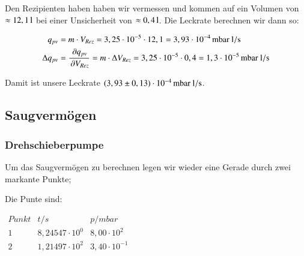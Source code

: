 Den Rezipienten haben haben wir vermessen und kommen auf ein Volumen von $\approx \unit[12,1]{l}$ bei einer Unsicherheit von $\approx \unit[0,4]{l}$. Die Leckrate berechnen wir dann so:

\begin{align*}
q_{pv} &= m \cdot V_{Rez} = 3,25 \cdot 10^{-5} \cdot 12,1 = \unit[3,93 \cdot 10^{-4}]{mbar \ l/s} \\
\Delta q_{pv} &= \frac{\p q_{pv}}{\p V_{Rez}} = m \cdot \Delta V_{Rez} = 3,25 \cdot 10^{-5} \cdot 0,4 = \unit[1,3 \cdot 10^{-5}]{mbar \ l/s}
\end{align*}

Damit ist unsere Leckrate $\unit[(3,93 \pm 0,13) \cdot 10^{-4}]{mbar \ l/s}$.


\subsection*{Saugvermögen}

\subsubsection*{Drehschieberpumpe}

Um das Saugvermögen zu berechnen legen wir wieder eine Gerade durch zwei markante Punkte;

\begin{figure}[h]
\end{figure}

Die Punte sind:

\begin{center}
	$
	\begin{matrix}
	Punkt	& t/s & p/mbar \\ 
	1	& 8,24547 \cdot 10^{0} & 8,00 \cdot 10^{2} \\ 
	2	& 1,21497 \cdot 10^{2} & 3,40 \cdot 10^{-1} \\ 

	\end{matrix} 
	$	
\end{center}


